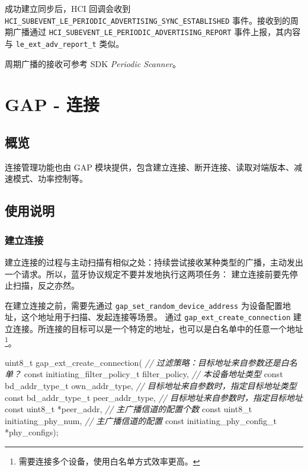 \documentclass[
  12pt,
]{book}
\newenvironment{Shaded}{\begin{snugshade}}{\end{snugshade}}
\newcommand{\CommentTok}[1]{\textcolor[rgb]{0.56,0.35,0.01}{\textit{#1}}}
\newcommand{\DataTypeTok}[1]{\textcolor[rgb]{0.13,0.29,0.53}{#1}}
\newcommand{\NormalTok}[1]{#1}
\begin{document}
成功建立同步后，HCI 回调会收到 \texttt{HCI\_SUBEVENT\_LE\_PERIODIC\_ADVERTISING\_SYNC\_ESTABLISHED} 事件。接收到的周期广播通过
\texttt{HCI\_SUBEVENT\_LE\_PERIODIC\_ADVERTISING\_REPORT} 事件上报，其内容与 \texttt{le\_ext\_adv\_report\_t} 类似。

周期广播的接收可参考 SDK \emph{Periodic Scanner}。

\hypertarget{ch-conn}{%
\chapter{GAP - 连接}\label{ch-conn}}

\hypertarget{ux6982ux89c8-2}{%
\section{概览}\label{ux6982ux89c8-2}}

连接管理功能也由 GAP 模块提供，包含建立连接、断开连接、读取对端版本、减速模式、功率控制等。

\hypertarget{ux4f7fux7528ux8bf4ux660e-2}{%
\section{使用说明}\label{ux4f7fux7528ux8bf4ux660e-2}}

\hypertarget{ux5efaux7acbux8fdeux63a5}{%
\subsection{建立连接}\label{ux5efaux7acbux8fdeux63a5}}

建立连接的过程与主动扫描有相似之处：持续尝试接收某种类型的广播，主动发出一个请求。所以，蓝牙协议规定不要并发地执行这两项任务：
建立连接前要先停止扫描，反之亦然。

在建立连接之前，需要先通过 \texttt{gap\_set\_random\_device\_address} 为设备配置地址，这个地址用于扫描、发起连接等场景。
通过 \texttt{gap\_ext\_create\_connection} 建立连接。所连接的目标可以是一个特定的地址，也可以是白名单中的任意一个地址\footnote{需要连接多个设备，使用白名单方式效率更高。}。

\begin{Shaded}
\begin{Highlighting}[]
\DataTypeTok{uint8_t}\NormalTok{ gap_ext_create_connection(}
  \CommentTok{// 过滤策略：目标地址来自参数还是白名单？}
  \DataTypeTok{const}\NormalTok{ initiating_filter_policy_t filter_policy,}
  \CommentTok{// 本设备地址类型}
  \DataTypeTok{const}\NormalTok{ bd_addr_type_t own_addr_type,}
  \CommentTok{// 目标地址来自参数时，指定目标地址类型}
  \DataTypeTok{const}\NormalTok{ bd_addr_type_t peer_addr_type,}
  \CommentTok{// 目标地址来自参数时，指定目标地址}
  \DataTypeTok{const} \DataTypeTok{uint8_t}\NormalTok{ *peer_addr,}
  \CommentTok{// 主广播信道的配置个数}
  \DataTypeTok{const} \DataTypeTok{uint8_t}\NormalTok{ initiating_phy_num,}
  \CommentTok{// 主广播信道的配置}
  \DataTypeTok{const}\NormalTok{ initiating_phy_config_t *phy_configs);}
\end{Highlighting}
\end{Shaded}
\end{document}
